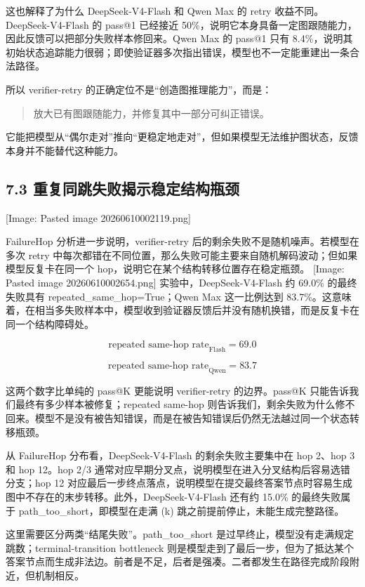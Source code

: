 \documentclass[
  11pt,
]{article}
\begin{document}
这也解释了为什么 DeepSeek-V4-Flash 和 Qwen Max 的 retry
收益不同。DeepSeek-V4-Flash 的 pass@1 已经接近
50\%，说明它本身具备一定图跟随能力，因此反馈可以把部分失败样本修回来。Qwen
Max 的 pass@1 只有
8.4\%，说明其初始状态追踪能力很弱；即使验证器多次指出错误，模型也不一定能重建出一条合法路径。

所以 verifier-retry 的正确定位不是``创造图推理能力''，而是：

\begin{quote}
放大已有图跟随能力，并修复其中一部分可纠正错误。
\end{quote}

它能把模型从``偶尔走对''推向``更稳定地走对''，但如果模型无法维护图状态，反馈本身并不能替代这种能力。

\subsection{7.3
重复同跳失败揭示稳定结构瓶颈}\label{ux91cdux590dux540cux8df3ux5931ux8d25ux63edux793aux7a33ux5b9aux7ed3ux6784ux74f6ux9888}

{[}Image: Pasted image 20260610002119.png{]}

FailureHop 分析进一步说明，verifier-retry
后的剩余失败不是随机噪声。若模型在多次 retry
中每次都错在不同位置，那么失败可能主要来自随机解码波动；但如果模型反复卡在同一个
hop，说明它在某个结构转移位置存在稳定瓶颈。 {[}Image: Pasted image
20260610002654.png{]} 实验中，DeepSeek-V4-Flash 约 69.0\% 的最终失败具有
repeated\_same\_hop=True；Qwen Max 这一比例达到
83.7\%。这意味着，在相当多失败样本中，模型收到验证器反馈后并没有随机换错，而是反复卡在同一个结构障碍处。

\[
\text{repeated same-hop rate}_{\text{Flash}} = 69.0%
\]

\[
\text{repeated same-hop rate}_{\text{Qwen}} = 83.7%
\]

这两个数字比单纯的 pass@K 更能说明 verifier-retry 的边界。pass@K
只能告诉我们最终有多少样本被修复；repeated same-hop
则告诉我们，剩余失败为什么修不回来。模型不是没有被告知错误，而是在被告知错误后仍然无法越过同一个状态转移瓶颈。

从 FailureHop 分布看，DeepSeek-V4-Flash 的剩余失败主要集中在 hop 2、hop
3 和 hop 12。hop 2/3
通常对应早期分叉点，说明模型在进入分叉结构后容易选错分支；hop 12
对应最后一步终点落点，说明模型在提交最终答案节点时容易生成图中不存在的末步转移。此外，DeepSeek-V4-Flash
还有约 15.0\% 的最终失败属于 path\_too\_short，即模型在走满 (k)
跳之前提前停止，未能生成完整路径。

这里需要区分两类``结尾失败''。path\_too\_short
是过早终止，模型没有走满规定跳数；terminal-transition bottleneck
则是模型走到了最后一步，但为了抵达某个答案节点而生成非法边。前者是不足，后者是强凑。二者都发生在路径完成阶段附近，但机制相反。
\end{document}
